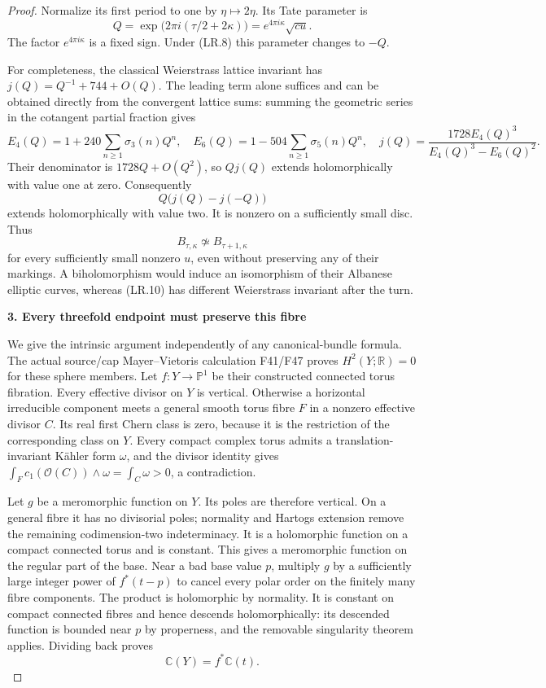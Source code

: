 \begin{proof}
Normalize its first period to one by \(\eta\mapsto2\eta\). Its
Tate parameter is
\[
 Q=\exp\bigl(2\pi i(\tau/2+2\kappa)\bigr)
    =e^{4\pi i\kappa}\sqrt{cu}.                     \tag{LR.10}
\]
The factor \(e^{4\pi i\kappa}\) is a fixed sign. Under (LR.8)
this parameter changes to \(-Q\).

For completeness, the classical Weierstrass lattice invariant has
\(j(Q)=Q^{-1}+744+O(Q)\). The leading term alone suffices and can
be obtained directly from the convergent lattice sums: summing the
geometric series in the cotangent partial fraction gives
\[
 E_4(Q)=1+240\sum_{n\ge1}\sigma_3(n)Q^n,
 \quad E_6(Q)=1-504\sum_{n\ge1}\sigma_5(n)Q^n,
 \quad
 j(Q)=\frac{1728E_4(Q)^3}{E_4(Q)^3-E_6(Q)^2}.
\]
Their denominator is \(1728Q+O(Q^2)\), so \(Qj(Q)\) extends
holomorphically with value one at zero. Consequently
\[
 Q\bigl(j(Q)-j(-Q)\bigr)
\]
extends holomorphically with value two. It is nonzero on a
sufficiently small disc. Thus
\[
            B_{\tau,\kappa}\not\simeq
            B_{\tau+1,\kappa}                       \tag{LR.11}
\]
for every sufficiently small nonzero \(u\), even without preserving
any of their markings. A biholomorphism would induce an isomorphism
of their Albanese elliptic curves, whereas (LR.10) has different
Weierstrass invariant after the turn.

\par

\medskip\noindent\textbf{3. Every threefold endpoint must preserve this fibre}

\par\nobreak

We give the intrinsic argument independently of any canonical-bundle
formula. The actual source/cap Mayer--Vietoris calculation F41/F47
proves \(H^2(Y;\mathbb R)=0\) for these sphere members. Let
\(f:Y\to\mathbb P^1\) be their constructed connected torus fibration.
Every effective divisor on \(Y\) is vertical. Otherwise a horizontal
irreducible component meets a general smooth torus fibre \(F\) in
a nonzero effective divisor \(C\). Its real first Chern class is
zero, because it is the restriction of the corresponding class on
\(Y\). Every compact complex torus admits a translation-invariant
Kähler form \(\omega\), and the divisor identity gives
\(\int_F c_1(\mathcal O(C))\wedge\omega=\int_C\omega>0\), a
contradiction.

Let \(g\) be a meromorphic function on \(Y\). Its poles are
therefore vertical. On a general fibre it has no divisorial poles;
normality and Hartogs extension remove the remaining codimension-two
indeterminacy. It is a holomorphic function on a compact connected
torus and is constant. This gives a meromorphic function on the
regular part of the base. Near a bad base value \(p\), multiply
\(g\) by a sufficiently large integer power of \(f^*(t-p)\) to
cancel every polar order on the finitely many fibre components.
The product is holomorphic by normality. It is constant on compact
connected fibres and hence descends holomorphically: its descended
function is bounded near \(p\) by properness, and the removable
singularity theorem applies. Dividing back proves
\[
                   \mathbb C(Y)=f^*\mathbb C(t).      \tag{LR.12}
\]


\end{proof}
